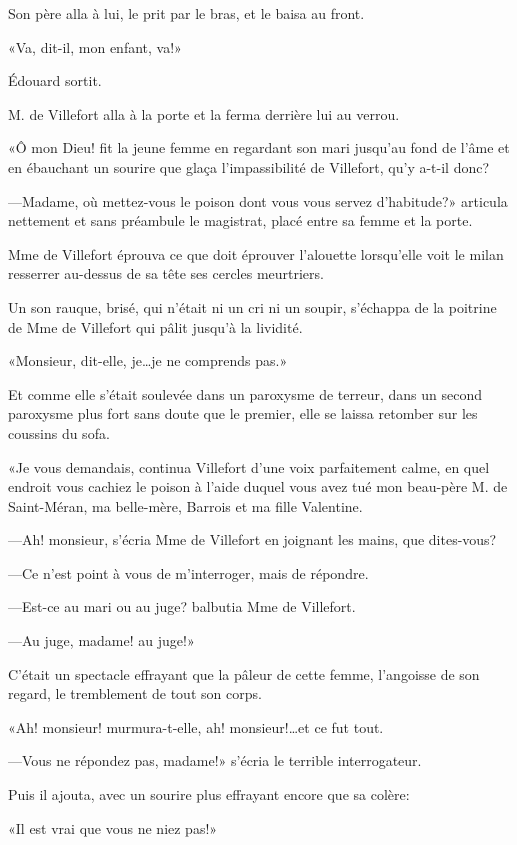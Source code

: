 Son père alla à lui, le prit par le bras, et le baisa au front. 

«Va, dit-il, mon enfant, va!» 

Édouard sortit. 

M. de Villefort alla à la porte et la ferma derrière lui au verrou. 

«Ô mon Dieu! fit la jeune femme en regardant son mari jusqu'au fond de l'âme et en ébauchant un sourire que glaça l'impassibilité de Villefort, qu'y a-t-il donc? 

—Madame, où mettez-vous le poison dont vous vous servez d'habitude?» articula nettement et sans préambule le magistrat, placé entre sa femme et la porte. 

Mme de Villefort éprouva ce que doit éprouver l'alouette lorsqu'elle voit le milan resserrer au-dessus de sa tête ses cercles meurtriers. 

Un son rauque, brisé, qui n'était ni un cri ni un soupir, s'échappa de la poitrine de Mme de Villefort qui pâlit jusqu'à la lividité. 

«Monsieur, dit-elle, je\dots je ne comprends pas.» 

Et comme elle s'était soulevée dans un paroxysme de terreur, dans un second paroxysme plus fort sans doute que le premier, elle se laissa retomber sur les coussins du sofa. 

«Je vous demandais, continua Villefort d'une voix parfaitement calme, en quel endroit vous cachiez le poison à l'aide duquel vous avez tué mon beau-père M. de Saint-Méran, ma belle-mère, Barrois et ma fille Valentine. 

—Ah! monsieur, s'écria Mme de Villefort en joignant les mains, que dites-vous? 

—Ce n'est point à vous de m'interroger, mais de répondre. 

—Est-ce au mari ou au juge? balbutia Mme de Villefort. 

—Au juge, madame! au juge!» 

C'était un spectacle effrayant que la pâleur de cette femme, l'angoisse de son regard, le tremblement de tout son corps. 

«Ah! monsieur! murmura-t-elle, ah! monsieur!\dots et ce fut tout. 

—Vous ne répondez pas, madame!» s'écria le terrible interrogateur. 

Puis il ajouta, avec un sourire plus effrayant encore que sa colère: 

«Il est vrai que vous ne niez pas!» 

